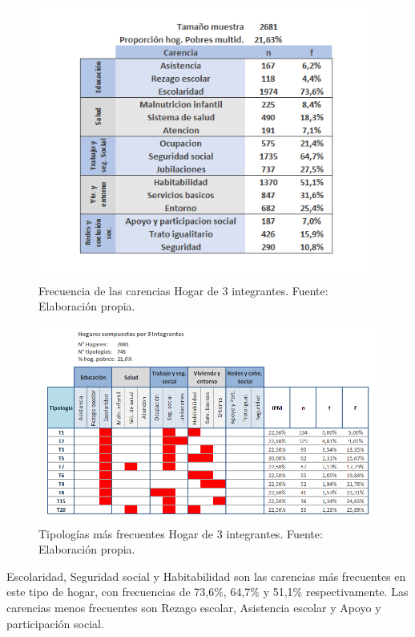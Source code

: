 \documentclass[12pt,letterpaper,spanish]{article}
\begin{document}
\begin{itemize}
    \begin{figure}[H]
        \centering
        \includegraphics[height=9cm]{HOGARES/tabla_num3.png}
        \caption{Frecuencia de las carencias Hogar de 3 integrantes. Fuente: Elaboración propia.}
        \label{fren3}
    \end{figure}

    \begin{figure}[H]
        \centering
        \includegraphics[width=\textwidth]{Mati N/n=3.png}
        \caption{Tipologías más frecuentes Hogar de 3 integrantes. Fuente: Elaboración propia.}
        \label{tipn3}
    \end{figure}
    
    Escolaridad, Seguridad social y Habitabilidad son las carencias más frecuentes en este tipo de hogar, con frecuencias de 73,6\%, 64,7\% y 51,1\% respectivamente. Las carencias menos frecuentes son Rezago escolar, Asistencia escolar y Apoyo y participación social.
    

\end{itemize}
\end{document}
